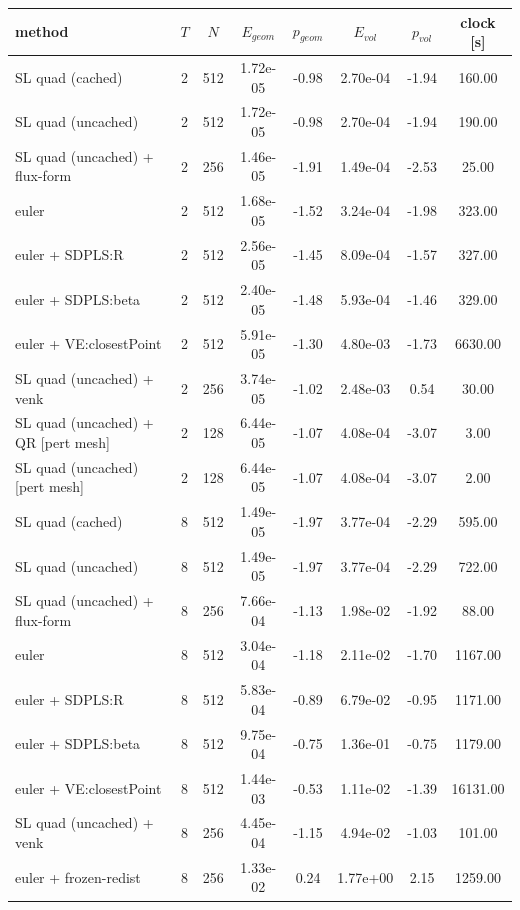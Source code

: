 \begin{tabular}{l c c c c c c c}
\hline
method & $T$ & $N$ & $E_{geom}$ & $p_{geom}$ & $E_{vol}$ & $p_{vol}$ & clock [s] \\
\hline
SL quad (cached) & 2 & 512 & 1.72e-05 & -0.98 & 2.70e-04 & -1.94 & 160.00 \\
SL quad (uncached) & 2 & 512 & 1.72e-05 & -0.98 & 2.70e-04 & -1.94 & 190.00 \\
SL quad (uncached) + flux-form & 2 & 256 & 1.46e-05 & -1.91 & 1.49e-04 & -2.53 & 25.00 \\
euler & 2 & 512 & 1.68e-05 & -1.52 & 3.24e-04 & -1.98 & 323.00 \\
euler + SDPLS:R & 2 & 512 & 2.56e-05 & -1.45 & 8.09e-04 & -1.57 & 327.00 \\
euler + SDPLS:beta & 2 & 512 & 2.40e-05 & -1.48 & 5.93e-04 & -1.46 & 329.00 \\
euler + VE:closestPoint & 2 & 512 & 5.91e-05 & -1.30 & 4.80e-03 & -1.73 & 6630.00 \\
SL quad (uncached) + venk & 2 & 256 & 3.74e-05 & -1.02 & 2.48e-03 & 0.54 & 30.00 \\
SL quad (uncached) + QR [pert mesh] & 2 & 128 & 6.44e-05 & -1.07 & 4.08e-04 & -3.07 & 3.00 \\
SL quad (uncached) [pert mesh] & 2 & 128 & 6.44e-05 & -1.07 & 4.08e-04 & -3.07 & 2.00 \\
SL quad (cached) & 8 & 512 & 1.49e-05 & -1.97 & 3.77e-04 & -2.29 & 595.00 \\
SL quad (uncached) & 8 & 512 & 1.49e-05 & -1.97 & 3.77e-04 & -2.29 & 722.00 \\
SL quad (uncached) + flux-form & 8 & 256 & 7.66e-04 & -1.13 & 1.98e-02 & -1.92 & 88.00 \\
euler & 8 & 512 & 3.04e-04 & -1.18 & 2.11e-02 & -1.70 & 1167.00 \\
euler + SDPLS:R & 8 & 512 & 5.83e-04 & -0.89 & 6.79e-02 & -0.95 & 1171.00 \\
euler + SDPLS:beta & 8 & 512 & 9.75e-04 & -0.75 & 1.36e-01 & -0.75 & 1179.00 \\
euler + VE:closestPoint & 8 & 512 & 1.44e-03 & -0.53 & 1.11e-02 & -1.39 & 16131.00 \\
SL quad (uncached) + venk & 8 & 256 & 4.45e-04 & -1.15 & 4.94e-02 & -1.03 & 101.00 \\
euler + frozen-redist & 8 & 256 & 1.33e-02 & 0.24 & 1.77e+00 & 2.15 & 1259.00 \\
\hline
\end{tabular}
